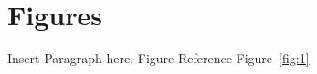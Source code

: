 \documentclass[english]{article}
\begin{document}

\nocite{*}
\maketitle

\setcounter{page}{1}


\clearpage
\pagebreak
\section{Figures}

\par Insert Paragraph here. Figure Reference Figure~\ref{fig:1}
\end{document}
